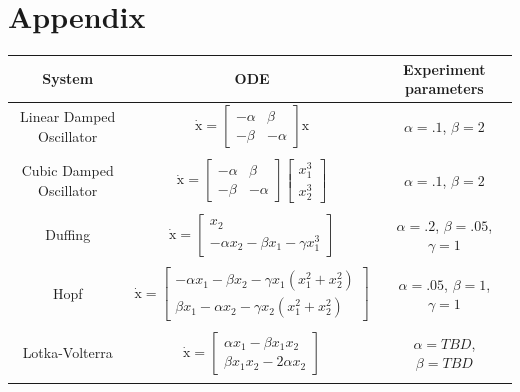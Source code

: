 \documentclass{article}
\renewcommand{\vec}[1]{\boldsymbol{\mathrm{#1}}}
\begin{document}
\section*{Appendix}
\begin{table}[ht]
    \centering
    \label{tab:ODEs}
    \begin{tabular}{c c c}
        System & ODE & Experiment parameters\\
        \hline\hline
        Linear Damped Oscillator
            & $\dot {\vec x} = \left[\begin{matrix}-\alpha & \beta \\ -\beta & -\alpha\end{matrix}\right] \vec x$
            & $\alpha = .1$, $\beta=2 $\\\\
        Cubic Damped Oscillator
            & $\dot {\vec x} = \left[\begin{matrix}-\alpha & \beta \\ -\beta & -\alpha\end{matrix}\right] \left[\begin{matrix}x_1^3\\x_2^3\end{matrix}\right]$
            & $\alpha = .1$, $\beta=2 $\\\\
        Duffing
            & $\dot {\vec x} = \left[\begin{matrix}x_2 \\ -\alpha x_2 - \beta x_1 -\gamma x_1^3\end{matrix}\right]$
            & $\alpha = .2$, $\beta=.05 $, $\gamma=1$\\\\
        Hopf
            & $\dot {\vec x} = \left[\begin{matrix}
                -\alpha x_1 -\beta x_2 - \gamma x_1(x_1 ^2 + x_2^2) \\
                \beta x_1 - \alpha x_2 -\gamma x_2(x_1 ^2 + x_2^2)
            \end{matrix}\right]$
            & $\alpha = .05$, $\beta=1 $, $\gamma=1$\\\\
        Lotka-Volterra
            & $\dot {\vec x} = \left[\begin{matrix}
                \alpha x_1 - \beta x_1 x_2 \\
                \beta x_1  x_2 - 2 \alpha x_2
            \end{matrix}\right]$
            & $\alpha = TBD$, $\beta=TBD $\\\\

\end{tabular}
\end{table}
\end{document}
